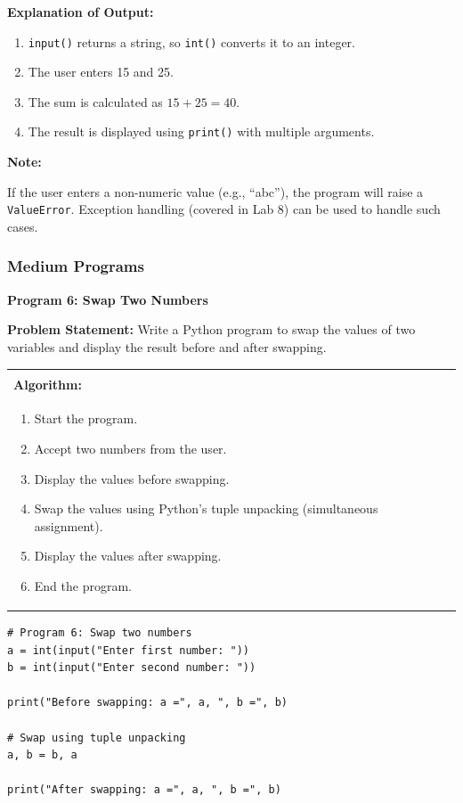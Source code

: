 \documentclass[12pt,a4paper]{article}
\makeatletter
\newenvironment{notebox}{%
  \par\vspace{4pt}%
  \noindent\textbf{Note:}\par\vspace{2pt}%
  \begin{minipage}{\linewidth}%
  \small%
}{%
  \end{minipage}\par\vspace{4pt}%
}
\newenvironment{algobox}{%
  \par\vspace{4pt}%
  \noindent\begin{tabular}{@{}p{\linewidth}@{}}%
  \hline\\[-8pt]%
  \textbf{\color{blue!60!black}\small Algorithm:}\\[2pt]%
}{%
  \\[-4pt]\hline%
  \end{tabular}\par\vspace{4pt}%
}
\makeatother
\begin{document}
\textbf{Explanation of Output:}
\begin{enumerate}
  \item \texttt{input()} returns a string, so \texttt{int()} converts it to an integer.
  \item The user enters 15 and 25.
  \item The sum is calculated as $15 + 25 = 40$.
  \item The result is displayed using \texttt{print()} with multiple arguments.
\end{enumerate}

\begin{notebox}
If the user enters a non-numeric value (e.g., ``abc''), the program will raise a \texttt{ValueError}. Exception handling (covered in Lab 8) can be used to handle such cases.
\end{notebox}

\subsubsection{Medium Programs}

\textbf{Program 6: Swap Two Numbers}

\textbf{Problem Statement:}
Write a Python program to swap the values of two variables and display the result before and after swapping.

\begin{algobox}
\begin{enumerate}[label=Step \arabic*:]
  \item Start the program.
  \item Accept two numbers from the user.
  \item Display the values before swapping.
  \item Swap the values using Python's tuple unpacking (simultaneous assignment).
  \item Display the values after swapping.
  \item End the program.
\end{enumerate}
\end{algobox}

\begin{lstlisting}
# Program 6: Swap two numbers
a = int(input("Enter first number: "))
b = int(input("Enter second number: "))

print("Before swapping: a =", a, ", b =", b)

# Swap using tuple unpacking
a, b = b, a

print("After swapping: a =", a, ", b =", b)
\end{lstlisting}
\end{document}
